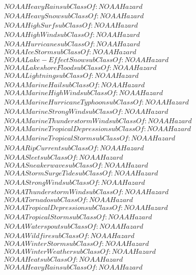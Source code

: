\begin{align}
  NOAAHeavyRain subClassOf: NOAAHazard\\
  NOAAHeavySnow subClassOf: NOAAHazard\\
  NOAAHighSurf subClassOf: NOAAHazard\\
  NOAAHighWind subClassOf: NOAAHazard\\
  NOAAHurricane subClassOf: NOAAHazard\\
  NOAAIceStorm subClassOf: NOAAHazard\\
  NOAALake-EffectSnow subClassOf: NOAAHazard\\
  NOAALakeshoreFlood subClassOf: NOAAHazard\\
  NOAALightning subClassOf: NOAAHazard\\
  NOAAMarineHail subClassOf: NOAAHazard\\
  NOAAMarineHighWind subClassOf: NOAAHazard\\
  NOAAMarineHurricaneTyphoon subClassOf: NOAAHazard\\
  NOAAMarineStrongWind subClassOf: NOAAHazard\\
  NOAAMarineThunderstormWind subClassOf: NOAAHazard\\
  NOAAMarineTropicalDepression subClassOf: NOAAHazard\\
  NOAAMarineTropicalStorm subClassOf: NOAAHazard\\
  NOAARipCurrent subClassOf: NOAAHazard\\
  NOAASleet subClassOf: NOAAHazard\\
  NOAASneakerwave subClassOf: NOAAHazard\\
  NOAAStormSurgeTide subClassOf: NOAAHazard\\
  NOAAStrongWind subClassOf: NOAAHazard\\
  NOAAThunderstormWind subClassOf: NOAAHazard\\
  NOAATornado subClassOf: NOAAHazard\\
  NOAATropicalDepression subClassOf: NOAAHazard\\
  NOAATropicalStorm subClassOf: NOAAHazard\\
  NOAAWaterspout subClassOf: NOAAHazard\\
  NOAAWildfire subClassOf: NOAAHazard\\
  NOAAWinterStorm subClassOf: NOAAHazard\\
  NOAAWinterWeather subClassOf: NOAAHazard\\
  NOAAHeat subClassOf: NOAAHazard\\
  NOAAHeavyRain subClassOf: NOAAHazard\\

\end{align}
